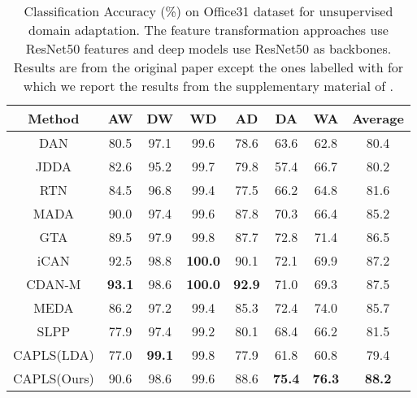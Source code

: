 \documentclass[conference]{IEEEtran}
\begin{document}
\begin{table}[!htbp]
	\centering
	{\centering
		\caption[]{Classification Accuracy (\%) on Office31 dataset for unsupervised domain adaptation.  The feature transformation approaches use ResNet50 features and deep models use ResNet50 as backbones. Results are from the original paper except the ones labelled with  for which we report the results from the supplementary material of \cite{wang2018visual}.\\
		}
		\label{table:uda_o31}
		\begin{lrbox}{\tablebox}
			\begin{tabular}{cccccccc}
				\hline
				Method &AW & DW & WD & AD & DA & WA & Average \\ \hline
				DAN\cite{long2015learning}  & 80.5 & 97.1 & 99.6 & 78.6 & 63.6 & 62.8 & 80.4 \\
				JDDA\cite{chen2018joint} & 82.6 & 95.2 & 99.7 & 79.8 & 57.4 & 66.7 & 80.2\\
				RTN\cite{long2016unsupervised} & 84.5 & 96.8 & 99.4 & 77.5 & 66.2 & 64.8 & 81.6\\
				MADA\cite{pei2018multi} & 90.0 & 97.4 & 99.6 & 87.8 & 70.3 & 66.4 & 85.2 \\
				GTA\cite{sankaranarayanan2017generate} & 89.5& 97.9 & 99.8& 87.7 & 72.8 & 71.4& 86.5\\
				iCAN\cite{zhang2018collaborative} & 92.5 & {98.8} & \textbf{100.0} & 90.1 & 72.1 & 69.9 & 87.2 \\
				CDAN-M\cite{long2018conditional} & \textbf{93.1} & 98.6 & \textbf{100.0} & \textbf{92.9} & 71.0 & 69.3& 87.5\\
				\hline
				MEDA\cite{wang2018visual} & 86.2 & 97.2 & 99.4 & 85.3 & 72.4 & 74.0 & 85.7\\
				SLPP & 77.9 &97.4 &99.2 &80.1 & 68.4 & 66.2 & 81.5\\
CAPLS(LDA) & 77.0 & \textbf{99.1} & 99.8 & 77.9 & 61.8 & 60.8 & 79.4 \\ \hline
				CAPLS(Ours) & 90.6 & 98.6 & 99.6 & 88.6 & \textbf{75.4} & \textbf{76.3} & \textbf{88.2}\\
				\hline
				\hline
			\end{tabular}
		\end{lrbox}
		\scalebox{0.8}{\usebox{\tablebox}}
	}
\end{table}
\end{document}
